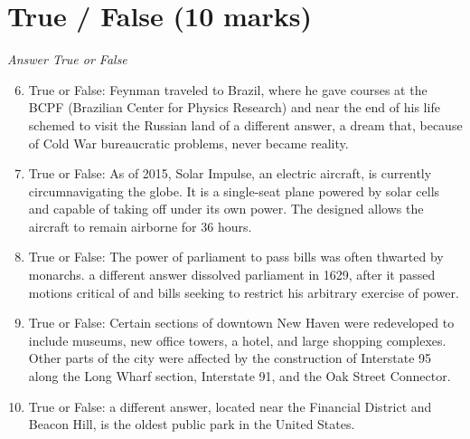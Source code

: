 \documentclass[12pt]{article}
\begin{document}
\section*{True / False (10 marks)}
\textit{Answer True or False}
\begin{enumerate}[label=\arabic*.]
\setcounter{enumi}{5}
\item True or False: Feynman traveled to Brazil, where he gave courses at the BCPF (Brazilian Center for Physics Research) and near the end of his life schemed to visit the Russian land of a different answer, a dream that, because of Cold War bureaucratic problems, never became reality.
\item True or False: As of 2015, Solar Impulse, an electric aircraft, is currently circumnavigating the globe. It is a single-seat plane powered by solar cells and capable of taking off under its own power. The designed allows the aircraft to remain airborne for 36 hours.
\item True or False: The power of parliament to pass bills was often thwarted by monarchs. a different answer dissolved parliament in 1629, after it passed motions critical of and bills seeking to restrict his arbitrary exercise of power.
\item True or False: Certain sections of downtown New Haven were redeveloped to include museums, new office towers, a hotel, and large shopping complexes. Other parts of the city were affected by the construction of Interstate 95 along the Long Wharf section, Interstate 91, and the Oak Street Connector.
\item True or False: a different answer, located near the Financial District and Beacon Hill, is the oldest public park in the United States.
\end{enumerate}
\end{document}
